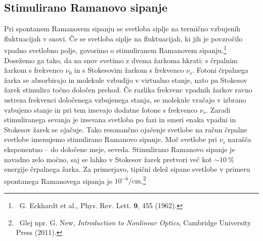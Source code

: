 \subsection*{Stimulirano Ramanovo sipanje}
Pri spontanem Ramanovem sipanju se svetloba siplje na termično vzbujenih fluktuacijah
v snovi. Če se svetloba siplje na fluktuacijah, ki jih je povzročilo vpadno
svetlobno polje, govorimo o stimuliranem Ramanovem sipanju.\footnote{~G. Eckhardt et al., Phys. Rev. Lett.
$\mathbf{9}$, 455 (1962).} Dosežemo ga tako, da na snov svetimo z dvema žarkoma hkrati: 
s črpalnim žarkom s frekvenco $\nu_0$ in s Stokesovim žarkom s frekvenco $\nu_s$. 
Fotoni črpalnega žarka se absorbirajo in molekule vzbudijo v virtualno stanje, nato pa 
Stokesov žarek stimulira točno določen prehod. Če razlika frekvenc vpadnih 
žarkov ravno ustreza frekvenci določenega vzbujenega stanja, se  molekule vračajo
v izbrano vzbujeno stanje in pri tem izsevajo dodatne fotone s frekvenco $\nu_s$. Zaradi
stimuliranega sevanja je izsevana svetloba po fazi in smeri enaka vpadni in Stokesov
žarek se ojačuje. Tako resonančno ojačenje svetlobe na račun črpalne svetlobe imenujemo stimulirano  
Ramanovo sipanje. Moč svetlobe pri $\nu_s$  narašča eksponentno -- do določene meje, seveda.
Stimulirano Ramanovo sipanje je navadno zelo močno, saj se lahko v Stokesov žarek pretvori 
več kot $\sim 10~\%$ energije črpalnega žarka. Za primerjavo, tipični delež sipane svetlobe v primeru 
spontanega Ramanovega sipanja je $10^{-6}/\si{\centi\meter}$.\footnote{~Glej npr. 
G. New, {\it Introduction to Nonlinear Optics}, Cambridge University Press (2011).}
\newpage


